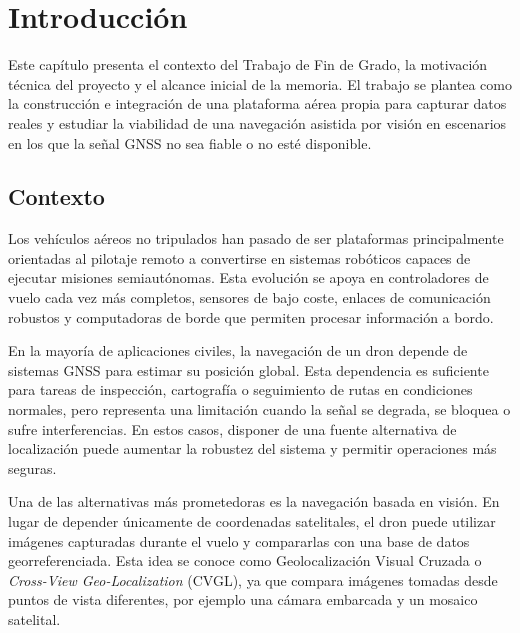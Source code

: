 
\chapter{Introducción}
\label{cap:introduccion}

\begin{Resumen}
Este capítulo presenta el contexto del Trabajo de Fin de Grado, la motivación técnica del proyecto y el alcance inicial de la memoria. El trabajo se plantea como la construcción e integración de una plataforma aérea propia para capturar datos reales y estudiar la viabilidad de una navegación asistida por visión en escenarios en los que la señal GNSS no sea fiable o no esté disponible.
\end{Resumen}

\section{Contexto}
\label{sec:introduccion-contexto}

Los vehículos aéreos no tripulados han pasado de ser plataformas principalmente orientadas al pilotaje remoto a convertirse en sistemas robóticos capaces de ejecutar misiones semiautónomas. Esta evolución se apoya en controladores de vuelo cada vez más completos, sensores de bajo coste, enlaces de comunicación robustos y computadoras de borde que permiten procesar información a bordo.

En la mayoría de aplicaciones civiles, la navegación de un dron depende de sistemas GNSS para estimar su posición global. Esta dependencia es suficiente para tareas de inspección, cartografía o seguimiento de rutas en condiciones normales, pero representa una limitación cuando la señal se degrada, se bloquea o sufre interferencias. En estos casos, disponer de una fuente alternativa de localización puede aumentar la robustez del sistema y permitir operaciones más seguras.

Una de las alternativas más prometedoras es la navegación basada en visión. En lugar de depender únicamente de coordenadas satelitales, el dron puede utilizar imágenes capturadas durante el vuelo y compararlas con una base de datos georreferenciada. Esta idea se conoce como Geolocalización Visual Cruzada o \textit{Cross-View Geo-Localization} (CVGL), ya que compara imágenes tomadas desde puntos de vista diferentes, por ejemplo una cámara embarcada y un mosaico satelital.

